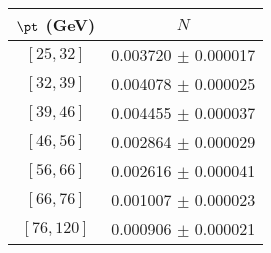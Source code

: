 \begin{tabular}{c||c}
$\pt$ (GeV) & $N$  \\
\hline
$[25, 32]$ & 0.003720 $\pm$ 0.000017\\
$[32, 39]$ & 0.004078 $\pm$ 0.000025\\
$[39, 46]$ & 0.004455 $\pm$ 0.000037\\
$[46, 56]$ & 0.002864 $\pm$ 0.000029\\
$[56, 66]$ & 0.002616 $\pm$ 0.000041\\
$[66, 76]$ & 0.001007 $\pm$ 0.000023\\
$[76, 120]$ & 0.000906 $\pm$ 0.000021\\
\end{tabular}
